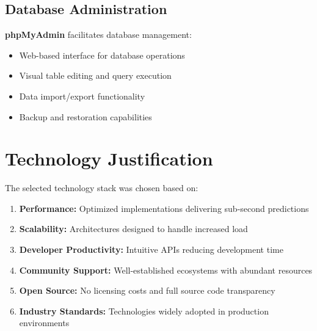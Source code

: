 \documentclass[12pt,a4paper,twoside]{report}
\begin{document}
\subsection*{Database Administration}

\textbf{phpMyAdmin} facilitates database management:

\begin{itemize}
    \item Web-based interface for database operations
    \item Visual table editing and query execution
    \item Data import/export functionality
    \item Backup and restoration capabilities
\end{itemize}

\section*{Technology Justification}

The selected technology stack was chosen based on:

\begin{enumerate}
    \item \textbf{Performance:} Optimized implementations delivering sub-second predictions
    \item \textbf{Scalability:} Architectures designed to handle increased load
    \item \textbf{Developer Productivity:} Intuitive APIs reducing development time
    \item \textbf{Community Support:} Well-established ecosystems with abundant resources
    \item \textbf{Open Source:} No licensing costs and full source code transparency
    \item \textbf{Industry Standards:} Technologies widely adopted in production environments
\end{enumerate}
\end{document}
